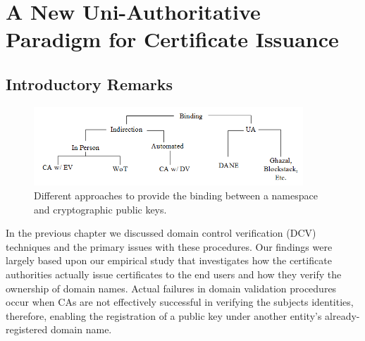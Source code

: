 \chapter{A New Uni-Authoritative Paradigm for Certificate Issuance}

\section{Introductory Remarks}
\label{sec:chap4Introductory Remarks}

\begin{figure}[t]
\centering
\includegraphics[width=0.9\textwidth]{Fig/binding.png}
\caption{\footnotesize{Different approaches to provide the binding between a namespace and cryptographic public keys.}}
\label{fig:Binding}
\end{figure}

In the previous chapter we discussed domain control verification (DCV) techniques and the primary issues with these procedures. Our findings were largely based upon our empirical study that investigates how the certificate authorities actually issue certificates to the end users and how they verify the ownership of domain names. Actual failures in domain validation procedures occur when CAs are not effectively successful in verifying the subjects identities, therefore, enabling the registration of a public key under another entity's already-registered domain name.

